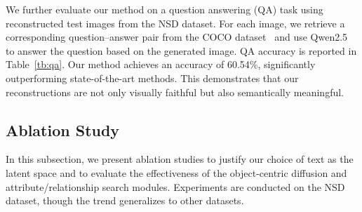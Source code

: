 We further evaluate our method on a question answering (QA) task using reconstructed test images from the NSD dataset. For each image, we retrieve a corresponding question–answer pair from the COCO dataset~\citep{lin2014microsoft} and use Qwen2.5~\citep{bai2025qwen2} to answer the question based on the generated image. QA accuracy is reported in Table~\ref{tb:qa}. Our method achieves an accuracy of 60.54\%, significantly outperforming state-of-the-art methods. This demonstrates that our reconstructions are not only visually faithful but also semantically meaningful.













\subsection{Ablation Study}

In this subsection, we present ablation studies to justify our choice of text as the latent space and to evaluate the effectiveness of the object-centric diffusion and attribute/relationship search modules.
Experiments are conducted on the NSD dataset, though the trend generalizes to other datasets. 

